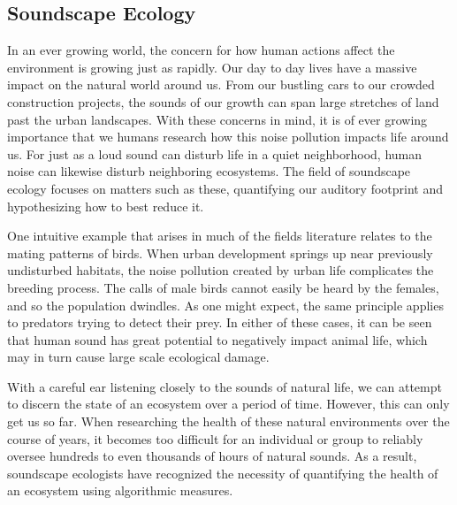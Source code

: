 \subsection{Soundscape Ecology}
In an ever growing world, the concern for how human actions affect the environment is growing just as rapidly. Our day to day lives have a massive impact on the natural world around us. From our bustling cars to our crowded construction projects, the sounds of our growth can span large stretches of land past the urban landscapes. With these concerns in mind, it is of ever growing importance that we humans research how this noise pollution impacts life around us. For just as a loud sound can disturb life in a quiet neighborhood, human noise can likewise disturb neighboring ecosystems. The field of soundscape ecology focuses on matters such as these, quantifying our auditory footprint and hypothesizing how to best reduce it.\par
One intuitive example that arises in much of the field\textquotesingle s literature relates to the mating patterns of birds. When urban development springs up near previously undisturbed habitats, the noise pollution created by urban life complicates the breeding process. The calls of male birds cannot easily be heard by the females, and so the population dwindles. As one might expect, the same principle applies to predators trying to detect their prey. In either of these cases, it can be seen that human sound has great potential to negatively impact animal life, which may in turn cause large scale ecological damage.\par
With a careful ear listening closely to the sounds of natural life, we can attempt to discern the state of an ecosystem over a period of time. However, this can only get us so far. When researching the health of these natural environments over the course of years, it becomes too difficult for an individual or group to reliably oversee hundreds to even thousands of hours of natural sounds. As a result, soundscape ecologists have recognized the necessity of quantifying the health of an ecosystem using algorithmic measures.